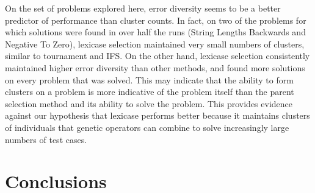 On the set of problems explored here, error diversity seems to be a better predictor of performance than cluster counts. In fact, on two of the problems for which  solutions were found in over half the runs (String Lengths Backwards and Negative To Zero), lexicase selection maintained very small numbers of clusters, similar to tournament and IFS. 
On the other hand, lexicase selection consistently maintained higher error diversity than other methods, and found more solutions on every problem that was solved. This may indicate that the ability to form clusters on a problem is more indicative of the problem itself than the parent selection method and its ability to solve the problem. This provides evidence against our hypothesis that lexicase performs better because it maintains clusters of individuals that genetic operators can combine to solve increasingly large numbers of test cases.


\section{Conclusions}

